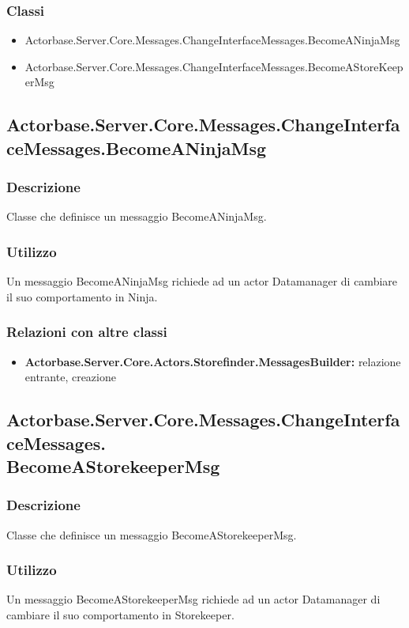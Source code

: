 \documentclass[a4paper]{article}
\begin{document}
			\subsubsection{Classi}
			\begin{itemize}
				\item Actorbase.Server.Core.Messages.ChangeInterfaceMessages.BecomeANinjaMsg
				\item Actorbase.Server.Core.Messages.ChangeInterfaceMessages.BecomeAStoreKeeperMsg
			\end{itemize}

			\subsection{Actorbase.Server.Core.Messages.ChangeInterfaceMessages.BecomeANinjaMsg}
			\subsubsection{Descrizione}
				Classe che definisce un messaggio BecomeANinjaMsg.
			\subsubsection{Utilizzo}
				Un messaggio BecomeANinjaMsg richiede ad un actor Datamanager di cambiare il suo comportamento in Ninja.
			\subsubsection{Relazioni con altre classi}
			\begin{itemize}
				\item \textbf{Actorbase.Server.Core.Actors.Storefinder.MessagesBuilder:} relazione entrante, creazione
			\end{itemize}

			\subsection{Actorbase.Server.Core.Messages.ChangeInterfaceMessages.\\ BecomeAStorekeeperMsg}
			\subsubsection{Descrizione}
				Classe che definisce un messaggio BecomeAStorekeeperMsg.
			\subsubsection{Utilizzo}
				Un messaggio BecomeAStorekeeperMsg richiede ad un actor Datamanager di cambiare il suo comportamento in Storekeeper.
\end{document}

